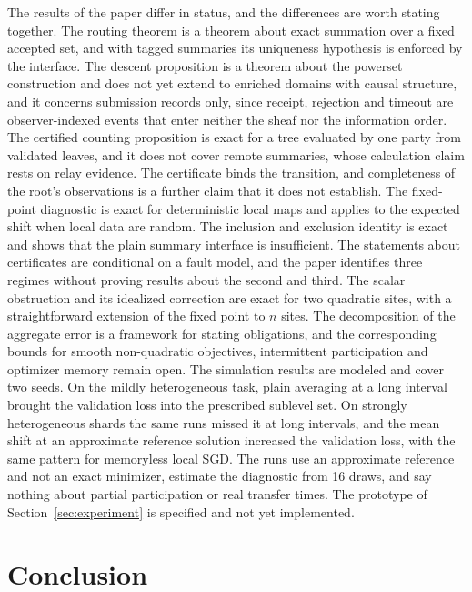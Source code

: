 \documentclass[11pt]{article}
\theoremstyle{definition}
\theoremstyle{remark}
\begin{document}
The results of the paper differ in status, and the differences are worth stating together. The routing theorem is a theorem about exact summation over a fixed accepted set, and with tagged summaries its uniqueness hypothesis is enforced by the interface. The descent proposition is a theorem about the powerset construction and does not yet extend to enriched domains with causal structure, and it concerns submission records only, since receipt, rejection and timeout are observer-indexed events that enter neither the sheaf nor the information order. The certified counting proposition is exact for a tree evaluated by one party from validated leaves, and it does not cover remote summaries, whose calculation claim rests on relay evidence. The certificate binds the transition, and completeness of the root's observations is a further claim that it does not establish. The fixed-point diagnostic is exact for deterministic local maps and applies to the expected shift when local data are random. The inclusion and exclusion identity is exact and shows that the plain summary interface is insufficient. The statements about certificates are conditional on a fault model, and the paper identifies three regimes without proving results about the second and third. The scalar obstruction and its idealized correction are exact for two quadratic sites, with a straightforward extension of the fixed point to $n$ sites. The decomposition of the aggregate error is a framework for stating obligations, and the corresponding bounds for smooth non-quadratic objectives, intermittent participation and optimizer memory remain open. The simulation results are modeled and cover two seeds. On the mildly heterogeneous task, plain averaging at a long interval brought the validation loss into the prescribed sublevel set. On strongly heterogeneous shards the same runs missed it at long intervals, and the mean shift at an approximate reference solution increased the validation loss, with the same pattern for memoryless local SGD. The runs use an approximate reference and not an exact minimizer, estimate the diagnostic from 16 draws, and say nothing about partial participation or real transfer times. The prototype of Section~\ref{sec:experiment} is specified and not yet implemented.

\section*{Conclusion}
\end{document}

